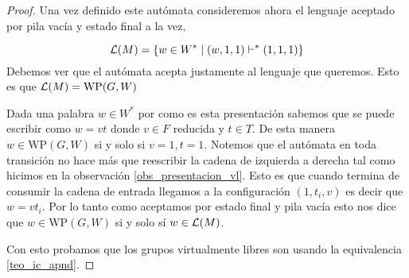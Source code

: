 \documentclass[tesis.tex]{subfiles}
\begin{document}
\begin{proof}
	Una vez definido este autómata consideremos ahora el lenguaje aceptado por pila vacía y estado final a la vez,
	
	\[
	{\cal L }(M) = \{  w \in W^* \mid (w,1,1)   \vdash^*  (1, 1, 1)  \}
	\]
	Debemos ver que el autómata acepta justamente al lenguaje que queremos. 
	Esto es que $ {\cal L }(M) = \text{WP}(G,W) $ 
	
	
	Dada una palabra $w \in W^*$ por como es esta presentación sabemos que se puede escribir como $w = vt$ donde $v \in F$ reducida y $t \in  T$. 
	De esta manera $w \in \text{WP}(G,W)$ si y solo si $v=1, t=1$.
	Notemos que el autómata en toda transición no hace más que reescribir la cadena de izquierda a derecha tal como hicimos en la observación \ref{obs_presentacion_vl}.
	Esto es que cuando termina de consumir la cadena de entrada llegamos a la configuración $(1, t_i, v)$ es decir que $w = vt_i$.
	Por lo tanto como aceptamos por estado final y pila vacía esto nos dice que $w \in \text{WP}(G,W)$ si y solo sí $w \in {\cal L}(M)$.
	
	Con esto probamos que los grupos virtualmente libres son \ic usando la equivalencia \ref{teo_ic_apnd}.
	
\end{proof}
\begin{center}
\end{center}
\end{document}
